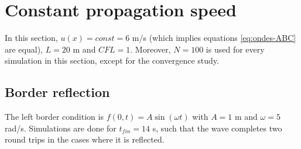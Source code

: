 \documentclass[a4paper,12pt,twoside]{article}
\begin{document}
    \newpage

    \section{Constant propagation speed}
    In this section, $u(x)=const=6$ m/s (which implies equations \eqref{eq:ondes-ABC} are equal), $L=20$ m and $CFL=1$. Moreover, $N=100$ is used for every simulation in this section, except for the convergence study.

    \subsection{Border reflection}
    The left border condition is $f(0,t)=A\sin(\omega t)$ with $A=1$ m and $\omega=5$ rad/s. Simulations are done for $t_{fin}=14$ s, such that the wave completes two round trips in the cases where it is reflected.
\end{document}
